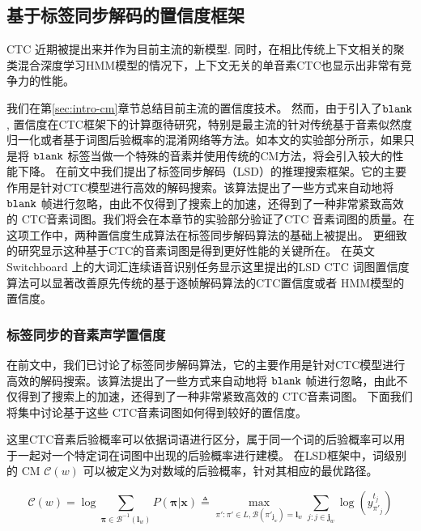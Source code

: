 \subsection{基于标签同步解码的置信度框架}
\label{chap:unify-confidence}

CTC\cite{graves2006connectionist} 近期被提出来并作为目前主流的新模型\cite{fernandez2008phoneme}\cite{sainath2015acoustic}\cite{amodei2015deep}\cite{sak2015fast}.
同时，在相比传统上下文相关的聚类混合深度学习HMM模型\cite{sak2015fast}\cite{miao2015eesen}\cite{miao2016ctc}\cite{mcgraw2016personalized}的情况下，上下文无关的单音素CTC也显示出非常有竞争力的性能。

我们在第\ref{sec:intro-cm}章节总结目前主流的置信度技术。
然而，由于引入了$\tt blank$, 置信度在CTC框架下的计算亟待研究，特别是最主流的针对传统基于音素似然度归一化或者基于词图后验概率的混淆网络等方法。如本文的实验部分所示，如果只是将 $\tt blank$ 标签当做一个特殊的音素并使用传统的CM方法，将会引入较大的性能下降。
在前文中我们提出了标签同步解码（LSD）的推理搜索框架。它的主要作用是针对CTC模型进行高效的解码搜索。该算法提出了一些方式来自动地将 $\tt blank$ 帧进行忽略，由此不仅得到了搜索上的加速，还得到了一种非常紧致高效的 CTC音素词图。我们将会在本章节的实验部分验证了CTC 音素词图的质量。在这项工作中，两种置信度生成算法在标签同步解码算法的基础上被提出。
更细致的研究显示这种基于CTC的音素词图是得到更好性能的关键所在。
在英文Switchboard 上的大词汇连续语音识别任务显示这里提出的LSD CTC 词图置信度算法可以显著改善原先传统的基于逐帧解码算法的CTC置信度或者 HMM模型的置信度。


\subsubsection{标签同步的音素声学置信度}
\label{sec:psd-ac-conf}

在前文中，我们已讨论了标签同步解码算法，它的主要作用是针对CTC模型进行高效的解码搜索。该算法提出了一些方式来自动地将 $\tt blank$ 帧进行忽略，由此不仅得到了搜索上的加速，还得到了一种非常紧致高效的 CTC音素词图。
下面我们将集中讨论基于这些 CTC音素词图如何得到较好的置信度。

这里CTC音素后验概率可以依据词语进行区分，属于同一个词的后验概率可以用于一起对一个特定词在词图中出现的后验概率进行建模。
在LSD框架中，词级别的 CM $\mathcal{C}(w)$ 可以被定义为对数域的后验概率，针对其相应的最优路径。


     \begin{equation}\label{eq:psd-ac-conf1}
        \mathcal{C}(w)  =
         \log\!\!\!\!\!\!\sum_{\bm\pi \in \mathcal{B}^{-1}(\mathbf{l}_w)}{\!\!\!\!\!\!P(\bm\pi|\mathbf{x})}
        \triangleq
   \!\!\!\!\!\!\mathop{\max}\limits
       _{\!\!\!\!\pi':\pi' \in L, \mathcal{B}(\pi'_{\mathbf{j}_w})       =       {\mathbf{l}}_w}
   \sum_{j:j\in \mathbf{j}_w}
   \log({y^{t_{j}}_{\pi'_{j}}})
     \end{equation}

